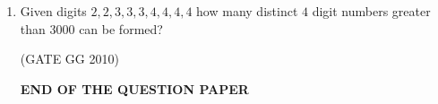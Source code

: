\documentclass[journal]{IEEEtran}
\begin{document}
\begin{enumerate}[start=26]
(GATE EE 2025)

\begin{enumerate}
\end{enumerate}

\item Given digits $2, 2, 3, 3, 3, 4, 4, 4, 4$ how many distinct $4$ digit numbers greater than $3000$ can be formed?

\hfill{(GATE GG 2010)}

\begin{enumerate}
\end{enumerate}

\vspace{2cm}
\textbf{END OF THE QUESTION PAPER}
\end{enumerate}
\end{document}
